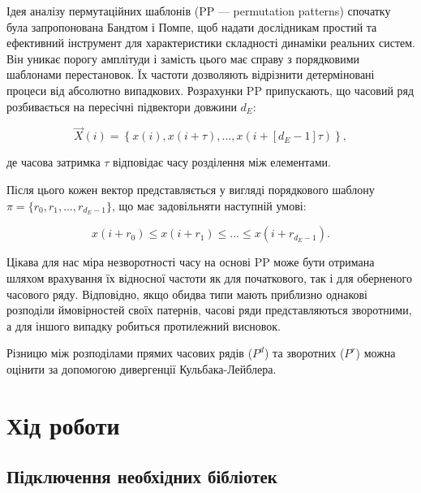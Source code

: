 \documentclass[
  letterpaper,
]{report}
\begin{document}
Ідея аналізу пермутаційних шаблонів (PP --- permutation patterns)
спочатку була запропонована Бандтом і Помпе, щоб надати дослідникам
простий та ефективний інструмент для характеристики складності динаміки
реальних систем. Він уникає порогу амплітуди і замість цього має справу
з порядковими шаблонами перестановок. Їх частоти дозволяють відрізнити
детерміновані процеси від абсолютно випадкових. Розрахунки PP
припускають, що часовий ряд розбивається на пересічні підвектори довжини
\(d_{E}\):

\[ 
\vec{X}(i) = \left\{ x(i), x(i+\tau), ... , x(i+[d_{E}-1]\tau) \right\}, 
\]

де часова затримка \(\tau\) відповідає часу розділення між елементами.

Після цього кожен вектор представляється у вигляді порядкового шаблону
\(\pi = \{ r_0, r_1, ... , r_{d_{E}-1} \}\), що має задовільняти
наступній умові:

\[ 
x(i+r_0) \leq x(i+r_1) \leq ... \leq x(i+r_{d_{E}-1}).
\]

Цікава для нас міра незворотності часу на основі PP може бути отримана
шляхом врахування їх відносної частоти як для початкового, так і для
оберненого часового ряду. Відповідно, якщо обидва типи мають приблизно
однакові розподіли ймовірностей своїх патернів, часові ряди
представляються зворотними, а для іншого випадку робиться протилежний
висновок.

Різницю між розподілами прямих часових рядів (\(P^{d}\)) та зворотних
(\(P^{r}\)) можна оцінити за допомогою дивергенції Кульбака-Лейблера.

\hypertarget{ux445ux456ux434-ux440ux43eux431ux43eux442ux438-6}{%
\section{Хід
роботи}\label{ux445ux456ux434-ux440ux43eux431ux43eux442ux438-6}}

\hypertarget{ux43fux456ux434ux43aux43bux44eux447ux435ux43dux43dux44f-ux43dux435ux43eux431ux445ux456ux434ux43dux438ux445-ux431ux456ux431ux43bux456ux43eux442ux435ux43a}{%
\subsection{Підключення необхідних
бібліотек}\label{ux43fux456ux434ux43aux43bux44eux447ux435ux43dux43dux44f-ux43dux435ux43eux431ux445ux456ux434ux43dux438ux445-ux431ux456ux431ux43bux456ux43eux442ux435ux43a}}
\end{document}
